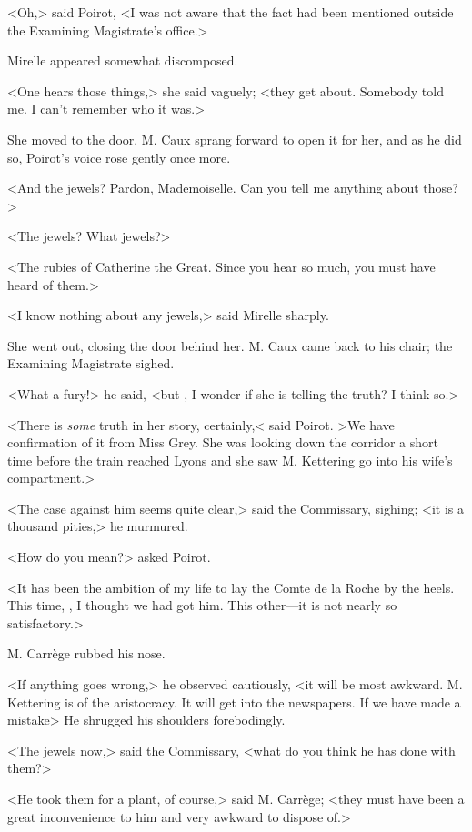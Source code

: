 <Oh,> said Poirot, <I was not aware that the fact had been mentioned outside the Examining Magistrate's office.>

Mirelle appeared somewhat discomposed.

<One hears those things,> she said vaguely; <they get about. Somebody told me. I can't remember who it was.>

She moved to the door. M. Caux sprang forward to open it for her, and as he did so, Poirot's voice rose gently once more.

<And the jewels? Pardon, Mademoiselle. Can you tell me anything about those?>

<The jewels? What jewels?>

<The rubies of Catherine the Great. Since you hear so much, you must have heard of them.>

<I know nothing about any jewels,> said Mirelle sharply.

She went out, closing the door behind her. M. Caux came back to his chair; the Examining Magistrate sighed.

<What a fury!> he said, <but , I wonder if she is telling the truth? I think so.>

<There is \emph{some} truth in her story, certainly,< said Poirot. >We have confirmation of it from Miss Grey. She was looking down the corridor a short time before the train reached Lyons and she saw M. Kettering go into his wife's compartment.>

<The case against him seems quite clear,> said the Commissary, sighing; <it is a thousand pities,> he murmured.

<How do you mean?> asked Poirot.

<It has been the ambition of my life to lay the Comte de la Roche by the heels. This time, , I thought we had got him. This other—it is not nearly so satisfactory.>

M. Carrège rubbed his nose.

<If anything goes wrong,> he observed cautiously, <it will be most awkward. M. Kettering is of the aristocracy. It will get into the newspapers. If we have made a mistake\longdash> He shrugged his shoulders forebodingly.

<The jewels now,> said the Commissary, <what do you think he has done with them?>

<He took them for a plant, of course,> said M. Carrège; <they must have been a great inconvenience to him and very awkward to dispose of.>

